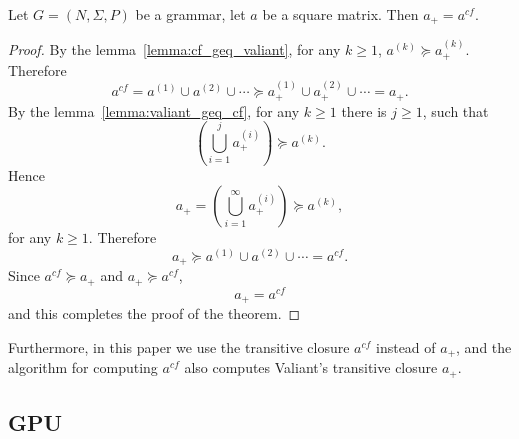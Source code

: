 \begin{mytheorem}\label{thm:closures}
	Let $G =(N,\Sigma,P)$ be a grammar, let $a$ be a square matrix. Then $a_+ = a^{cf}$.
\end{mytheorem}
\begin{proof}
	
	By the lemma~\ref{lemma:cf_geq_valiant}, for any $k \geq 1$, $a^{(k)} \succeq a^{(k)}_+$. Therefore $$a^{cf} = a^{(1)} \cup a^{(2)} \cup \cdots \succeq a^{(1)}_+ \cup a^{(2)}_+ \cup \cdots = a_+.$$ By the lemma~\ref{lemma:valiant_geq_cf}, for any $k \geq 1$ there is $j \geq 1$, such that $$(\bigcup^{j}_{i=1}{a^{(i)}_+}) \succeq a^{(k)}.$$ Hence $$a_+ = (\bigcup^{\infty}_{i=1}{a^{(i)}_+}) \succeq a^{(k)},$$ for any $k \geq 1$. Therefore $$a_+ \succeq a^{(1)} \cup a^{(2)} \cup \cdots = a^{cf}.$$ Since $a^{cf} \succeq a_+$ and $a_+ \succeq a^{cf}$, $$a_+ = a^{cf}$$ and this completes the proof of the theorem.
\end{proof}

Furthermore, in this paper we use the transitive closure $a^{cf}$ instead of $a_+$, and the algorithm for computing $a^{cf}$ also computes Valiant's transitive closure $a_+$.

\subsection{GPU}